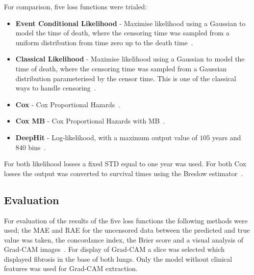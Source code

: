         For comparison, five loss functions were trialed:

        \begin{itemize}
            \item \textbf{Event Conditional Likelihood} - Maximise likelihood using a Gaussian to model the time of death, where the censoring time was sampled from a uniform distribution from time zero up to the death time~\cite{Shahin2023DeepAnalysis}.

            \item \textbf{Classical Likelihood} - Maximise likelihood using a Gaussian to model the time of death, where the censoring time was sampled from a Gaussian distribution parameterised by the censor time. This is one of the classical ways to handle censoring~\cite{Lee2018DeepHit:Risks}.

            \item \textbf{Cox} - Cox Proportional Hazards~\cite{Cox1972RegressionLife-Tables}.

            \item \textbf{Cox \gls{MB}} - Cox Proportional Hazards with \gls{MB}~\cite{Shahin2022SurvivalData}.

            \item \textbf{DeepHit} - Log-likelihood, with a maximum output value of $105$ years and $840$ bins~\cite{Lee2018DeepHit:Risks}.
        \end{itemize}

        For both likelihood losses a fixed \gls{STD} equal to one year was used. For both Cox losses the output was converted to survival times using the Breslow estimator~\cite{Breslow1974CovarianceData}.

    \vspace{-0.5cm}

    \subsection{Evaluation} \label{sec:evaluation}
        For evaluation of the results of the five loss functions the following methods were used; the \gls{MAE} and \gls{RAE} for the uncensored data between the predicted and true value was taken, the concordance index, the Brier score and a visual analysis of Grad-CAM images~\cite{Raykar2008OnIndex, Gerds2006ConsistentTimes, Selvaraju2020Grad-CAM:Localization}. For display of Grad-CAM a slice was selected which displayed fibrosis in the base of both lungs. Only the model without clinical features was used for Grad-CAM extraction.
